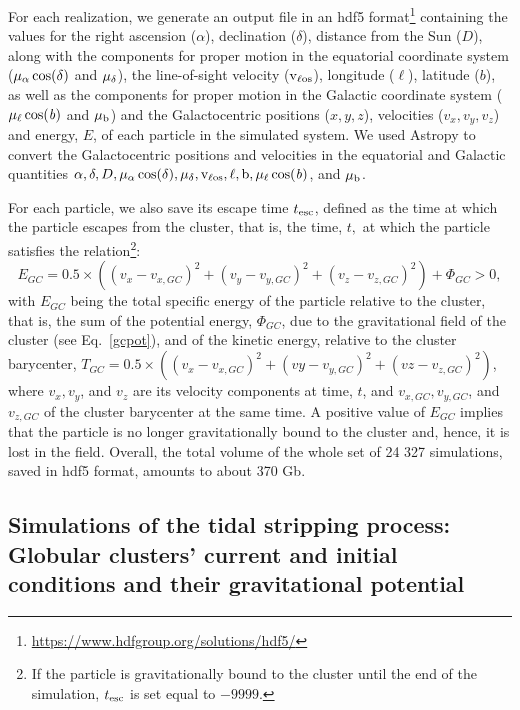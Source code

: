         For each realization, we generate an output file in an hdf5 format\footnote{\url{https://www.hdfgroup.org/solutions/hdf5/}} containing the values for the right ascension ($\alpha$), declination ($\delta$), distance from the Sun ($D$), along with the components for proper motion in the equatorial coordinate system ($\rm \mu_{\alpha}\cos(\delta)$ and $\rm \mu_\delta$), the line-of-sight velocity ($\rm v_{\ell os}$), longitude ($\ell$), latitude ($ b$), as well as the components for proper motion in the Galactic coordinate system ($\rm \mu_{\ell}\cos(\mathit{b})$ and $\rm \mu_b$) and the Galactocentric positions ($x, y, z$), velocities ($v_x, v_y, v_z$) and energy, $E$, of each particle in the simulated system. We used Astropy \citep{2013A&A...558A..33A, 2018AJ....156..123A} to convert the Galactocentric positions and velocities in the equatorial and Galactic quantities $\alpha, \delta, D, \rm \mu_{\alpha}\cos(\delta), \rm \mu_\delta, \rm v_{\ell os}, \ell, b, \rm \mu_{\ell}\cos(\mathit{b})$, and $\rm \mu_b$.

        For each particle, we also save its escape time $t_{\rm esc}$,  defined as the time at which the particle escapes from the cluster, that is, the time, $t,$ at which the particle satisfies the relation\footnote{If the particle is gravitationally bound to the cluster until the end of the simulation, $t_{\rm esc}$ is set equal to $-9999$.}:
        \begin{equation}
            E_{GC}= 0.5 \times \left( (v_x-v_{x, GC})^2+(v_y-v_{y,GC})^2+(v_z-v_{z,GC})^2\right)+\Phi_{GC} > 0,
        \end{equation}
        with $E_{GC}$ being the total specific energy of the particle relative to the cluster, that is, the sum of the potential energy, $\Phi_{GC}$, due to the gravitational field of the cluster (see Eq.~\ref{gcpot}), and of the kinetic energy, relative to the cluster barycenter, $T_{GC}=0.5 \times \left( \left(v_x-v_{x, GC}\right)^2+\left(vy-v_{y,GC}\right)^2+\left(vz-v_{z,GC}\right)^2\right)$, where $v_x, v_y$, and $v_z$ are its velocity components at time, $t$, and $v_{x,GC}, v_{y,GC}$, and $v_{z,GC}$  of the cluster barycenter at the same time. A positive value of $E_{GC}$ implies that the particle is no longer gravitationally bound to the cluster and, hence, it is lost in the field. Overall, the total volume of the whole set of  24 327 simulations, saved in hdf5 format, amounts to about 370 Gb.

        \subsection{Simulations of the tidal stripping process: Globular clusters' current and initial conditions and their gravitational potential}\label{initialconds}

